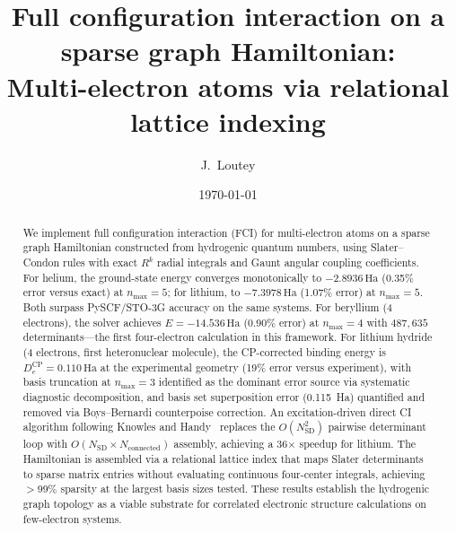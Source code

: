 \documentclass[aps,pra,twocolumn,superscriptaddress,longbibliography,floatfix]{revtex4-2}
\begin{document}
\title{Full configuration interaction on a sparse graph Hamiltonian:\\
Multi-electron atoms via relational lattice indexing}

\author{J.~Loutey}

\date{\today}

\begin{abstract}
We implement full configuration interaction (FCI) for multi-electron
atoms on a sparse graph Hamiltonian constructed from hydrogenic quantum
numbers, using Slater--Condon rules with exact $R^k$ radial integrals
and Gaunt angular coupling coefficients.
For helium, the ground-state energy converges monotonically to
$-2.8936\,\text{Ha}$ (0.35\% error versus exact) at $n_{\max}=5$;
for lithium, to $-7.3978\,\text{Ha}$ (1.07\% error) at $n_{\max}=5$.
Both surpass PySCF/STO-3G accuracy on the same systems.
For beryllium (4 electrons), the solver achieves $E = -14.536\,\text{Ha}$
(0.90\% error) at $n_{\max}=4$ with $487{,}635$ determinants---the
first four-electron calculation in this framework.
For lithium hydride (4 electrons, first heteronuclear molecule), the
CP-corrected binding energy is $D_e^{\text{CP}} = 0.110\,\text{Ha}$ at the
experimental geometry (19\% error versus experiment), with basis truncation
at $n_{\max}=3$ identified as the dominant error source via systematic
diagnostic decomposition, and basis set superposition error (0.115~Ha)
quantified and removed via Boys--Bernardi counterpoise correction.
An excitation-driven direct CI algorithm following
Knowles and Handy~\cite{Knowles1984} replaces the $O(N_{\text{SD}}^2)$
pairwise determinant loop with $O(N_{\text{SD}} \times N_{\text{connected}})$
assembly, achieving a 36$\times$ speedup for lithium.
The Hamiltonian is assembled via a relational lattice index that maps
Slater determinants to sparse matrix entries without evaluating
continuous four-center integrals, achieving $>$99\% sparsity at the
largest basis sizes tested.
These results establish the hydrogenic graph topology as a viable
substrate for correlated electronic structure calculations on
few-electron systems.
\end{abstract}

\maketitle
\end{document}
